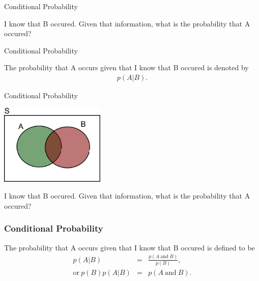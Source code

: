 \begin{frame}{Conditional Probability}

  I know that B occured. Given that information, what is the
  probability that A occured?

  \begin{definition}{Conditional Probability}

    The probability that A occurs given that I know that B occured is
    denoted by
    \begin{eqnarray*}
      p(A|B).
    \end{eqnarray*}
    
  \end{definition}
  
\end{frame}




\begin{frame}{Conditional Probability}

  \includegraphics[width=5cm]{img/vennDiagram}

  I know that B occured. Given that information, what is the
  probability that A occured?

  
\end{frame}

\begin{frame}
  \frametitle{Conditional Probability}

  \begin{definition}
    The probability that A occurs given that I know that B occured is
    defined to be 
    \begin{eqnarray*}
      p(A|B) & = & \frac{p(A \mathrm{~and~} B)}{p(B)}, \\
      \mathrm{or~} 
      p(B) p(A|B)  &  =  & p(A \mathrm{~and~} B).
    \end{eqnarray*}
  \end{definition}

\end{frame}


